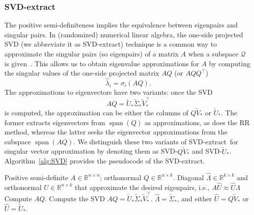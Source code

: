 \documentclass[onefignum,onetabnum]{siamart251216}
\def\subspace{\mathcal{Q}}
\def\svdmethod{SVD-extract}
\newcommand{\image}{\operatorname{span}}
\begin{document}
\subsubsection{\svdmethod}
The positive semi-definiteness implies the equivalence between eigenpairs and singular pairs. In (randomized) numerical linear algebra, the one-side projected SVD (we abbreviate it as \svdmethod) technique is a common way to approximate the singular pairs (so eigenpairs) of a matrix $A$ when a subspace $\subspace$ is given~\cite{gu2015subspace, halko2011finding, martinsson2020randomized}. This allows us to obtain eigenvalue approximations for $A$ by computing the singular values of the one-side projected matrix $AQ$ (or $AQQ^\top$)
\[
    \hat{\lambda}_i = \sigma_i(AQ).
\]
The approximations to eigenvectors have two variants: once the SVD
\[
    AQ = \widetilde{U}_{*} \widetilde{\Sigma}_* \widetilde{V}_{*}^\top
\]
is computed, the approximation can be either the columns of $Q\widetilde{V}_{*}$ or $\widetilde{U}_{*}$. The former extracts eigenvectors from $\image(Q)$ as approximations, as does the RR method, whereas the latter seeks the eigenvector approximations from the subspace $\image(AQ)$. We distinguish these two variants of \svdmethod\ for singular vector approximation by denoting them as SVD-$Q\tilde{V}_{*}$ and SVD-$\tilde{U}_{*}$. Algorithm~\ref{alg:SVD} provides the pseudocode of the \svdmethod. 

\begin{algorithm}
	 \small
	\renewcommand{\algorithmicrequire}{\textbf{Input:}}
	\renewcommand{\algorithmicensure}{\textbf{Output:}}
	\caption{\svdmethod}
	\begin{algorithmic}[1]
		\label{alg:SVD}
		\REQUIRE Positive semi-definite $A \in \mathbb{R}^{n \times n}$; orthonormal $Q \in \mathbb{R}^{n \times k}$.
		\ENSURE Diagonal $\hat{\Lambda} \in \mathbb{R}^{k \times k }$ and orthonormal $\hat{U} \in \mathbb{R}^{n \times k}$ that approximate the desired eigenpairs, i.e., $A\hat{U} \approx \hat{U}\hat{\Lambda}$
		\STATE Compute $AQ$.
		\STATE Compute the SVD $AQ = \widetilde{U}_{*} \widetilde{\Sigma}_* \widetilde{V}_{*}^\top$.
		\STATE $\hat{\Lambda} = \widetilde{\Sigma}_*$, and either $\hat{U} = Q \widetilde{V}_{*}$ or $\hat{U} = \widetilde{U}_{*}$.
	\end{algorithmic} 
\end{algorithm}
\end{document}
